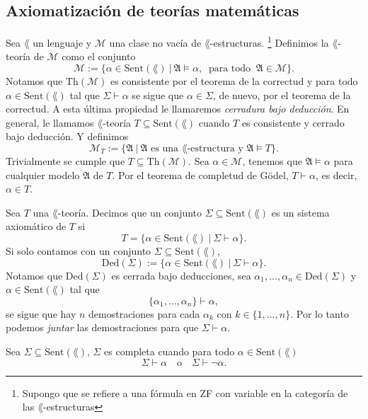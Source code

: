 \subsection{Axiomatizaci\'on de teor\'ias matem\'aticas}
\begin{definition}
  Sea $\lang$ un lenguaje y $\mathscr{M}$ una clase no vac\'ia de $\lang$-estructuras.
  \footnote{Supongo que se refiere a una f\'ormula en ZF con variable en la categor\'ia de las $\lang$-estructuras}
  Definimos la $\lang$-teor\'ia de $\mathscr{M}$ como el conjunto
  \[ \mathrm{\mathscr{M}} := \{ \alpha \in \mathrm{Sent} (\lang) \ | \ \mathfrak{A} \models \alpha, \ \text{ para todo } \ \mathfrak{A} \in \mathscr{M} \}. \]
  Notamos que $\mathrm{Th} (\mathscr{M})$ es consistente por el teorema de la correctud y para todo $\alpha \in \mathrm{Sent} (\lang)$ tal que $\Sigma \vdash \alpha$ se sigue que $\alpha \in \Sigma$, de nuevo, por el teorema de la correctud.  
  A esta \'ultima propiedad le llamaremos \emph{cerradura bajo deducci\'on}. \hfill \break
  En general, le llamamos $\lang$-teor\'ia $T \subseteq \mathrm{Sent} (\lang)$ cuando $T$ es consistente y cerrado bajo deducci\'on.
  Y definimos
  \[ \mathscr{M}_T := \{ \mathfrak{A} \ | \ \mathfrak{A} \text{ es una } \lang \text{-estructura y } \mathfrak{A} \models T \}. \]
  Trivialmente se cumple que $T \subseteq \mathrm{Th} (\mathscr{M})$.
  Sea $\alpha \in \mathscr{M}$, tenemos que $\mathfrak{A} \models \alpha$ para cualquier modelo $\mathfrak{A}$ de $T$.
  Por el teorema de completud de G\"odel, $T \vdash \alpha$, es decir, $\alpha \in T$.
\end{definition}
\begin{definition}
  Sea $T$ una $\lang$-teor\'ia. 
  Decimos que un conjunto $\Sigma \subseteq \mathrm{Sent} (\lang)$ es un sistema axiom\'atico de $T$ si 
  \[ T = \{ \alpha \in \mathrm{Sent} (\lang) \ | \ \Sigma \vdash \alpha \}. \]
  Si solo contamos con un conjunto $\Sigma \subseteq \mathrm{Sent} (\lang)$, 
  \[ \mathrm{Ded} (\Sigma) := \{ \alpha \in \mathrm{Sent} (\lang) \ | \ \Sigma \vdash \alpha \}. \]
  Notamos que $\mathrm{Ded} (\Sigma)$ es cerrada bajo deducciones, sea $\alpha_1, \dots, \alpha_n \in \mathrm{Ded} (\Sigma)$ y $\alpha \in \mathrm{Sent}(\lang)$ tal que 
  \[ \{ \alpha_1, \dots, \alpha_n\} \vdash \alpha, \]
  se sigue que hay $n$ demostraciones para cada $\alpha_k$ con $k \in \{ 1, \dots, n \}$.
  Por lo tanto podemos \emph{juntar} las demostraciones para que $\Sigma \vdash \alpha$.
\end{definition}
\begin{definition}
  Sea $\Sigma \subseteq \mathrm{Sent} (\lang)$, $\Sigma$ es completa cuando para todo $\alpha \in \mathrm{Sent} (\lang)$
  \[ \Sigma \vdash \alpha \quad \text{o} \quad \Sigma \vdash \neg \alpha. \]
\end{definition}
